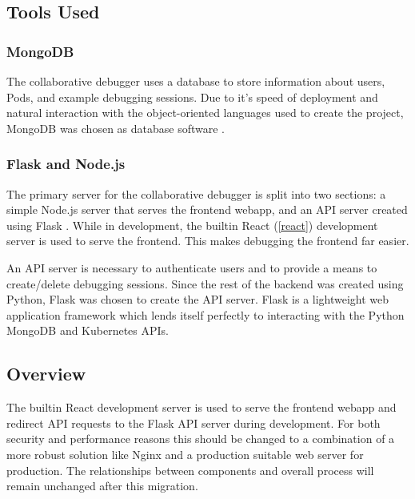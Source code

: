 \documentclass[12pt]{article}
\begin{document}
\subsection{Tools Used}

\subsubsection{MongoDB}\label{mongodb}

The collaborative debugger uses a database to store information about
users, Pods, and example debugging sessions.  Due to it's speed of
deployment and natural interaction with the object-oriented languages
used to create the project, MongoDB was chosen as database software
\cite{mongodb}.

\subsubsection{Flask and Node.js}\label{flask/node}

The primary server for the collaborative debugger is split into two
sections: a simple Node.js \cite{node} server that serves the frontend
webapp, and an API server created using Flask \cite{flask}.  While in
development, the builtin React (\ref{react}) development server
is used to serve the frontend.  This makes debugging the frontend far
easier.
\par

An API server is necessary to authenticate users and to provide a
means to create/delete debugging sessions.  Since the rest of the
backend was created using Python, Flask was chosen to create the API
server.  Flask is a lightweight web application framework which lends
itself perfectly to interacting with the Python MongoDB and Kubernetes
APIs.

\subsection{Overview}

The builtin React development server is used to serve the frontend
webapp and redirect API requests to the Flask API server during
development.  For both security and performance reasons this should be
changed to a combination of a more robust solution like Nginx
\cite{nginx} and a production suitable web server for production.  The
relationships between components and overall process will remain
unchanged after this migration.
\par
\end{document}
